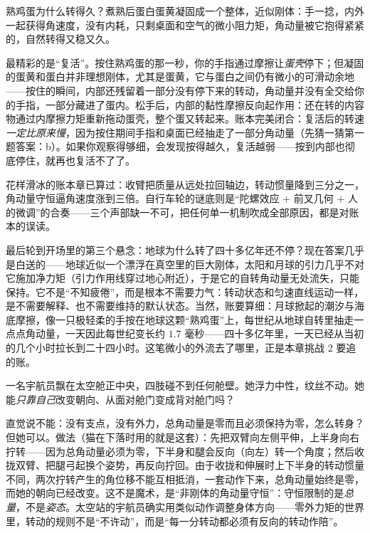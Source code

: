 熟鸡蛋为什么转得久？煮熟后蛋白蛋黄凝固成一个整体，近似刚体：手一捻，内外一起获得角速度，没有内耗，只剩桌面和空气的微小阻力矩，角动量被它抱得紧紧的，自然转得又稳又久。

最精彩的是“复活”。按住熟鸡蛋的那一秒，你的手指通过摩擦让\emph{蛋壳}停下；但凝固的蛋黄和蛋白并非理想刚体，尤其是蛋黄，它与蛋白之间仍有微小的可滑动余地——按住的瞬间，内部还残留着一部分没有停下来的转动，角动量并没有全交给你的手指，一部分藏进了蛋内。松手后，内部的黏性摩擦反向起作用：还在转的内容物通过内摩擦力矩重新拖动蛋壳，整个蛋又转起来。账本完美闭合：复活后的转速\emph{一定比原来慢}，因为按住期间手指和桌面已经抽走了一部分角动量（先猜一猜第一题答案：b）。如果你观察得够细，会发现按得越久，复活越弱——按到内部也彻底停住，就再也复活不了了。

花样滑冰的账本章已算过：收臂把质量从远处拉回轴边，转动惯量降到三分之一，角动量守恒逼角速度涨到三倍。自行车轮的谜底则是“陀螺效应 \(+\) 前叉几何 \(+\) 人的微调”的合奏——三个声部缺一不可，把任何单一机制吹成全部原因，都是对账本的误读。

最后轮到开场里的第三个悬念：地球为什么转了四十多亿年还不停？现在答案几乎是白送的——地球近似一个漂浮在真空里的巨大刚体，太阳和月球的引力几乎不对它施加净力矩（引力作用线穿过地心附近），于是它的自转角动量无处流失，只能保持。它不是“不知疲倦”，而是根本不需要力气：转动状态和匀速直线运动一样，是不需要解释、也不需要维持的默认状态。当然，账要算细：月球掀起的潮汐与海底摩擦，像一只极轻柔的手按在地球这颗“熟鸡蛋”上，每世纪从地球自转里抽走一点点角动量，一天因此每世纪变长约 \(1.7\) 毫秒——四十多亿年里，一天已经从当初的几个小时拉长到二十四小时。这笔微小的外流去了哪里，正是本章挑战 2 要追的账。


\begin{thought}[悬空的宇航员能不能转身？]
一名宇航员飘在太空舱正中央，四肢碰不到任何舱壁。她浮力中性，纹丝不动。她能\emph{只靠自己}改变朝向、从面对舱门变成背对舱门吗？

直觉说不能：没有支点，没有外力，总角动量是零而且必须保持为零，怎么转身？但她可以。做法（猫在下落时用的就是这套）：先把双臂向左侧平伸，上半身向右拧转——因为总角动量必须为零，下半身和腿会反向（向左）转一个角度；然后收拢双臂、把腿弓起换个姿势，再反向拧回。由于收拢和伸展时上下半身的转动惯量不同，两次拧转产生的角位移不能互相抵消，一套动作下来，总角动量始终是零，而她的朝向已经改变。这不是魔术，是“非刚体的角动量守恒”：守恒限制的是\emph{总量}，不是\emph{姿态}。太空站的宇航员确实用类似动作调整身体方向——零外力矩的世界里，转动的规则不是“不许动”，而是“每一分转动都必须有反向的转动作陪”。
\end{thought}

